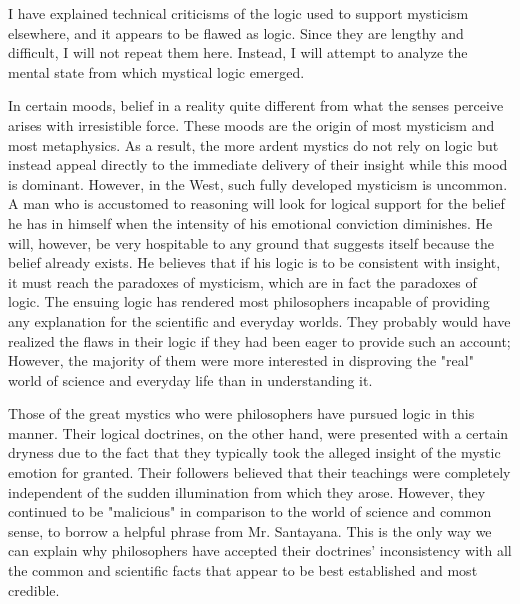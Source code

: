 \documentclass[a4paper,12pt]{book}[2004/02/16]
\theoremstyle{ilemma}
\theoremstyle{itheorem}
\theoremstyle{iother}
\theoremstyle{icorollary}
\theoremstyle{numcorollary}
\theoremstyle{idefinition}
\begin{document}
I have explained technical criticisms of the logic used to support mysticism elsewhere, and it appears to be flawed as logic. Since they are lengthy and difficult, I will not repeat them here. Instead, I will attempt to analyze the mental state from which mystical logic emerged.

In certain moods, belief in a reality quite different from what the senses perceive arises with irresistible force. These moods are the origin of most mysticism and most metaphysics. As a result, the more ardent mystics do not rely on logic but instead appeal directly to the immediate delivery of their insight while this mood is dominant. However, in the West, such fully developed mysticism is uncommon. A man who is accustomed to reasoning will look for logical support for the belief he has in himself when the intensity of his emotional conviction diminishes. He will, however, be very hospitable to any ground that suggests itself because the belief already exists. He believes that if his logic is to be consistent with insight, it must reach the paradoxes of mysticism, which are in fact the paradoxes of logic. The ensuing logic has rendered most philosophers incapable of providing any explanation for the scientific and everyday worlds. They probably would have realized the flaws in their logic if they had been eager to provide such an account; However, the majority of them were more interested in disproving the "real" world of science and everyday life than in understanding it.

Those of the great mystics who were philosophers have pursued logic in this manner. Their logical doctrines, on the other hand, were presented with a certain dryness due to the fact that they typically took the alleged insight of the mystic emotion for granted. Their followers believed that their teachings were completely independent of the sudden illumination from which they arose. However, they continued to be "malicious" in comparison to the world of science and common sense, to borrow a helpful phrase from Mr. Santayana. This is the only way we can explain why philosophers have accepted their doctrines' inconsistency with all the common and scientific facts that appear to be best established and most credible.
\end{document}
